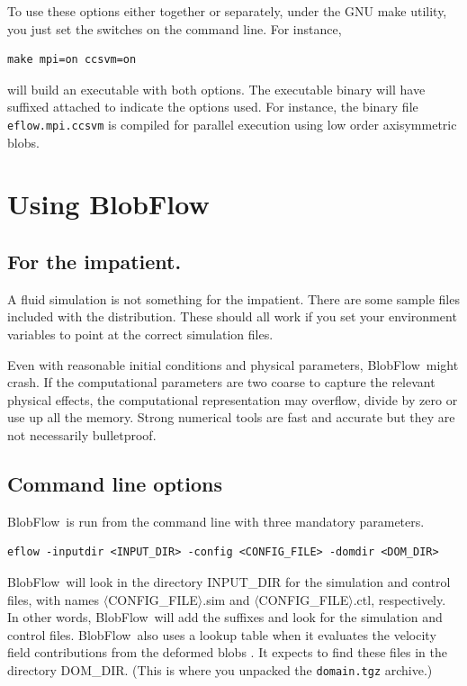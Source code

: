 \documentclass[12pt]{report}
\newcommand{\BF}{BlobFlow}
\begin{document}
To use these options either together or separately, under the GNU make
utility, you just set the switches on the command line. For instance,
\begin{verbatim}
make mpi=on ccsvm=on
\end{verbatim}
will build an executable with both options.  The executable binary will have
suffixed attached to indicate the options used.  For instance, the binary file
{\tt eflow.mpi.ccsvm} is compiled for parallel execution using low order
axisymmetric blobs.

\chapter{Using \BF}

\section{For the impatient.}

A fluid simulation is not something for the impatient.  There are some
sample files included with the distribution.  These should all work if you
set your environment variables to point at the correct simulation files.

Even with reasonable initial conditions and physical
parameters,
\BF~might crash.  If the computational parameters
are two coarse to capture the relevant physical effects, the computational
representation may overflow, divide by zero or use up all the memory.
Strong numerical tools are fast and accurate but they are not necessarily 
bulletproof.

\section{Command line options}

\BF~is run from the command line with three mandatory parameters.
\begin{verbatim}
eflow -inputdir <INPUT_DIR> -config <CONFIG_FILE> -domdir <DOM_DIR>
\end{verbatim}
\BF~will look in the directory INPUT\_DIR for the simulation and control files,
with names $\langle$CONFIG\_FILE$\rangle$.sim and
$\langle$CONFIG\_FILE$\rangle$.ctl, respectively.  In other words, \BF~will add
the suffixes and look for the simulation and control files.  \BF~also uses a
lookup table when it evaluates the velocity field contributions from the
deformed blobs \cite{platte-rossi-mitchell}.  It expects to find these files in
the directory DOM\_DIR.  (This is where you unpacked the \texttt{domain.tgz}
archive.)
\end{document}
